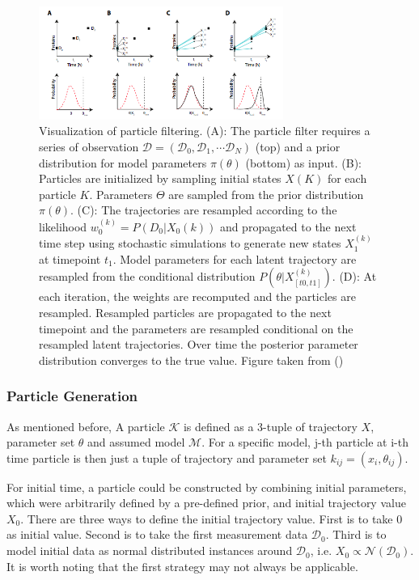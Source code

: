 \documentclass{bioinfo}
\begin{document}
\begin{figure}[h]
\includegraphics[width=8cm]{figures/particle_filtering.png}
\caption{Visualization of particle filtering. (A): The particle filter requires a series of observation $\mathcal{D} = (\mathcal{D}_0, \mathcal{D}_1, \cdots \mathcal{D}_N)$ (top) and a prior distribution for model parameters $\pi(\theta)$ (bottom) as input. (B): Particles are initialized by sampling initial states $X(K)$ for each particle $K$. Parameters $\Theta$ are sampled from the prior distribution $\pi(\theta)$. (C): The trajectories are resampled according to the likelihood $w_0^{(k)} = P(D_0|X_0(k))$ and propagated to the next time step using stochastic simulations to generate new states $X_1^{(k)}$ at timepoint $t_1$. Model parameters for each latent trajectory are resampled from the conditional distribution $P(\theta|X^{(k)}_{[t0,t1]})$. (D): At each iteration, the weights are recomputed and the particles are resampled. Resampled particles are propagated to the next timepoint and the parameters are resampled conditional on the resampled latent trajectories. Over time the posterior parameter distribution converges to the true value. Figure taken from (\citealp{Feigelman16})}  \label{fig:03}
\end{figure}

\vspace*{-6pt}

\subsubsection{Particle Generation}

As mentioned before, A particle $\mathcal{K}$ is defined as a 3-tuple of trajectory $X$, parameter set $\theta$ and assumed model $\mathcal{M}$. For a specific model, j-th particle at i-th time particle is then just a tuple of trajectory and parameter set $k_{ij} = (x_i, \theta_{ij})$.

For initial time, a particle could be constructed by combining initial parameters, which were arbitrarily defined by a pre-defined prior, and initial trajectory value $X_0$. There are three ways to define the initial trajectory value. First is to take 0 as initial value. Second is to take the first measurement data $\mathcal{D}_0$. Third is to model initial data as normal distributed instances around $\mathcal{D}_0$, i.e. $X_0 \propto \mathcal{N}(\mathcal{D}_0)$. It is worth noting that the first strategy may not always be applicable.
\end{document}
